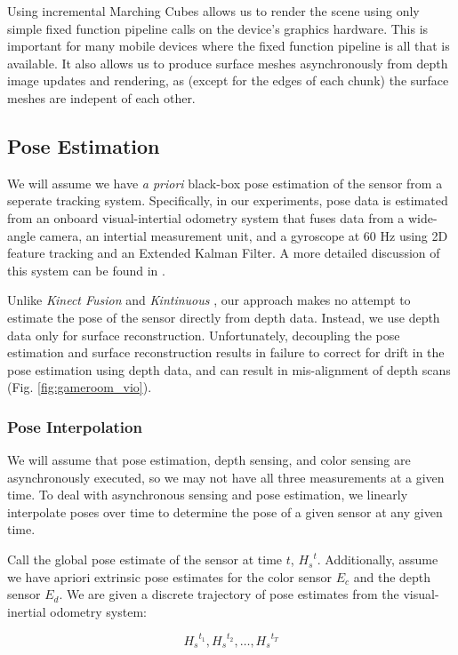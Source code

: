 \documentclass[conference,10pt]{IEEEtran}
\begin{document}
Using incremental Marching Cubes allows us to render the scene using only simple
fixed function pipeline calls on the device's graphics hardware. This is
important for many mobile devices where the fixed function pipeline is all that
is available. It also allows us to produce surface meshes asynchronously from
depth image updates and rendering, as (except for the edges of  each chunk) the
surface meshes are indepent of each other.

\subsection{Pose Estimation}
We will assume we  have \textit{a priori} black-box pose estimation of
the sensor from a seperate tracking system. Specifically, in our experiments,
pose data is estimated from an onboard visual-intertial odometry system that
fuses data from a wide-angle camera, an intertial measurement unit, and a
gyroscope at 60 Hz using 2D feature tracking and an Extended Kalman Filter. A
more detailed discussion of this system can be found in \cite{VINS}. 

Unlike \textit{Kinect Fusion} \cite{Newcombe} and \textit{Kintinuous}
\cite{Whelan2013}, our approach makes no attempt to estimate the pose of the
sensor directly from depth data. Instead, we use depth data only for surface
reconstruction. Unfortunately, decoupling the pose estimation and surface
reconstruction results in failure to correct for drift in the pose estimation
using depth data, and can result in mis-alignment of depth scans (Fig.
\ref{fig:gameroom_vio}).

\subsubsection{Pose Interpolation}
We will assume that pose estimation, depth sensing, and color sensing are
asynchronously executed, so we may not have all three measurements at a given
time. To deal with asynchronous sensing and pose estimation, we linearly
interpolate poses over time to determine the pose of a given sensor at any given time.

Call the global pose estimate of the sensor at time $t$,  ${H_{s}}^t$.
Additionally, assume we have apriori extrinsic pose estimates for the color
sensor ${E_{c}}$ and the depth sensor ${E_{d}}$. We are given a discrete
trajectory of pose estimates from the visual-inertial odometry system:

$$ {H_{s}}^{t_1}, {H_{s}}^{t_2}, \ldots, {H_{s}}^{t_T} $$
\end{document}
